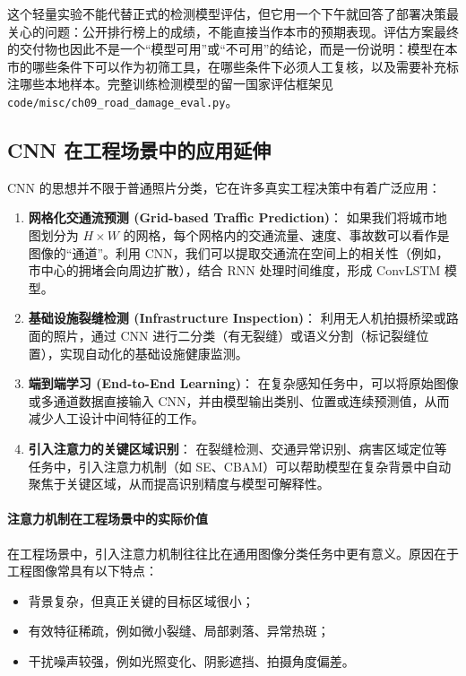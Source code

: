 这个轻量实验不能代替正式的检测模型评估，但它用一个下午就回答了部署决策最关心的问题：公开排行榜上的成绩，不能直接当作本市的预期表现。评估方案最终的交付物也因此不是一个“模型可用”或“不可用”的结论，而是一份说明：模型在本市的哪些条件下可以作为初筛工具，在哪些条件下必须人工复核，以及需要补充标注哪些本地样本。完整训练检测模型的留一国家评估框架见 \texttt{code/misc/ch09\_road\_damage\_eval.py}。

\subsection{CNN 在工程场景中的应用延伸}
CNN 的思想并不限于普通照片分类，它在许多真实工程决策中有着广泛应用：

\begin{enumerate}
    \item \textbf{网格化交通流预测 (Grid-based Traffic Prediction)}：
    如果我们将城市地图划分为 $H \times W$ 的网格，每个网格内的交通流量、速度、事故数可以看作是图像的“通道”。利用 CNN，我们可以提取交通流在空间上的相关性（例如，市中心的拥堵会向周边扩散），结合 RNN 处理时间维度，形成 ConvLSTM 模型。

    \item \textbf{基础设施裂缝检测 (Infrastructure Inspection)}：
    利用无人机拍摄桥梁或路面的照片，通过 CNN 进行二分类（有无裂缝）或语义分割（标记裂缝位置），实现自动化的基础设施健康监测。

    \item \textbf{端到端学习 (End-to-End Learning)}：
    在复杂感知任务中，可以将原始图像或多通道数据直接输入 CNN，并由模型输出类别、位置或连续预测值，从而减少人工设计中间特征的工作。

    \item \textbf{引入注意力的关键区域识别}：
    在裂缝检测、交通异常识别、病害区域定位等任务中，引入注意力机制（如 SE、CBAM）可以帮助模型在复杂背景中自动聚焦于关键区域，从而提高识别精度与模型可解释性。
\end{enumerate}

\paragraph{注意力机制在工程场景中的实际价值}

在工程场景中，引入注意力机制往往比在通用图像分类任务中更有意义。原因在于工程图像常具有以下特点：
\begin{itemize}
    \item 背景复杂，但真正关键的目标区域很小；
    \item 有效特征稀疏，例如微小裂缝、局部剥落、异常热斑；
    \item 干扰噪声较强，例如光照变化、阴影遮挡、拍摄角度偏差。
\end{itemize}

